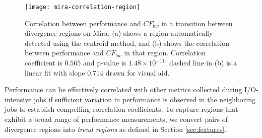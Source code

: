 \begin{figure}
    \centering
    \texttt{[image: mira-correlation-region]}
    \vspace{-.35in}
    \caption{Correlation between performance and $CF_{bw}$ in a transition between divergence regions on Mira. (a) shows a region automatically detected using the centroid method, and (b) shows the correlation between performance and $CF_{bw}$ in that region.  Correlation coefficient is $0.565$ and p-value is ${1.48 \times 10^{-11}}$; dashed line in (b) is a linear fit with slope $0.714$ drawn for visual aid.}
    \label{fig:mira-correlation-region}
\end{figure}


Performance can be effectively correlated with other metrics collected during I/O-intensive jobs if sufficient variation in performance is observed in the neighboring jobs to establish compelling correlation coefficients.
To capture regions that exhibit a broad range of performance measurements, we convert pairs of divergence regions into \emph{trend regions} as defined in Section \ref{sec:features}.

%
%

